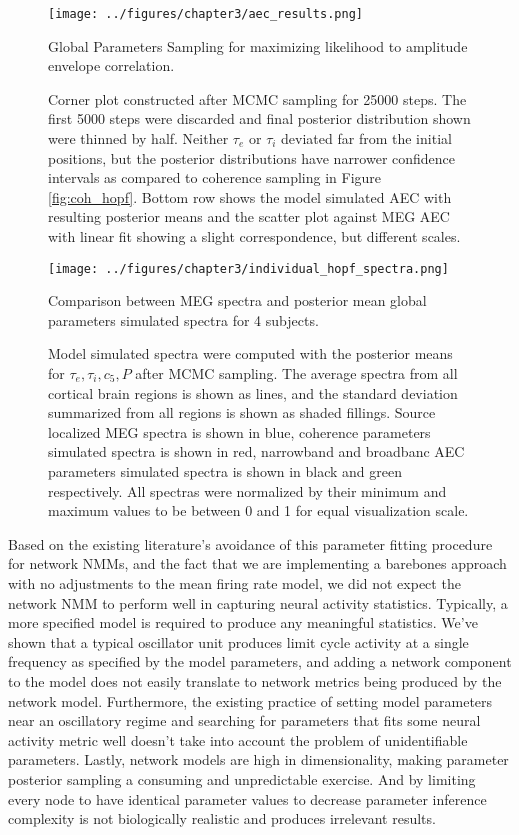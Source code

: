 \begin{figure}[htbp]
    \centering
    \texttt{[image: ../figures/chapter3/aec\_results.png]}
    \caption{Global Parameters Sampling for maximizing likelihood to amplitude envelope correlation.}
    \caption*{Corner plot constructed after MCMC sampling for 25000 steps. The first 5000 steps were discarded and final posterior distribution shown were thinned by half. Neither $\tau_e$ or $\tau_i$ deviated far from the initial positions, but the posterior distributions have narrower confidence intervals as compared to coherence sampling in Figure \ref{fig:coh_hopf}. Bottom row shows the model simulated AEC with resulting posterior means and the scatter plot against MEG AEC with linear fit showing a slight correspondence, but different scales.}
    \label{fig:aec_hopf}
\end{figure}

\begin{figure}[htbp]
    \centering
    \texttt{[image: ../figures/chapter3/individual\_hopf\_spectra.png]}
   \caption{Comparison between MEG spectra and posterior mean global parameters simulated spectra for 4 subjects.}
    \caption*{Model simulated spectra were computed with the posterior means for ${\tau_e, \tau_i, c_5, P}$ after MCMC sampling. The average spectra from all cortical brain regions is shown as lines, and the standard deviation summarized from all regions is shown as shaded fillings. Source localized MEG spectra is shown in blue, coherence parameters simulated spectra is shown in red, narrowband and broadbanc AEC parameters simulated spectra is shown in black and green respectively. All spectras were normalized by their minimum and maximum values to be between 0 and 1 for equal visualization scale.}
    \label{fig:psd_hopf}
\end{figure}

Based on the existing literature's avoidance of this parameter fitting procedure for network NMMs, and the fact that we are implementing a barebones approach with no adjustments to the mean firing rate model, we did not expect the network NMM to perform well in capturing neural activity statistics. Typically, a more specified model is required to produce any meaningful statistics. We've shown that a typical oscillator unit produces limit cycle activity at a single frequency as specified by the model parameters, and adding a network component to the model does not easily translate to network metrics being produced by the network model. Furthermore, the existing practice of setting model parameters near an oscillatory regime and searching for parameters that fits some neural activity metric well doesn't take into account the problem of unidentifiable parameters. Lastly, network models are high in dimensionality, making parameter posterior sampling a consuming and unpredictable exercise. And by limiting every node to have identical parameter values to decrease parameter inference complexity is not biologically realistic and produces irrelevant results. 


